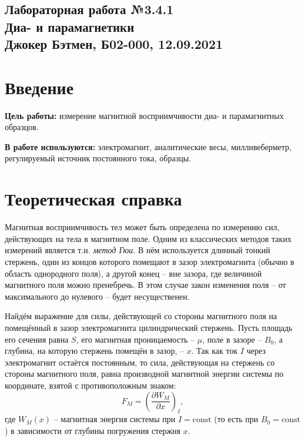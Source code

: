 \documentclass[a4paper,12pt]{article}
\begin{document}
  
\begin{center}
  \section*{Лабораторная работа №3.4.1 \\Диа- и парамагнетики \\Джокер Бэтмен, Б02-000, 12.09.2021}
\end{center}  

\vspace{5mm}
\section*{Введение}

\begin{flushleft}
  \textbf{Цель работы:} измерение магнитной восприимчивости диа- и парамагнитных образцов.
\end{flushleft}

\begin{flushleft}
  \textbf{В работе используются:} электромагнит, аналитические весы, милливеберметр, регулируемый источник постоянного тока, образцы.
\end{flushleft}

\section*{Теоретическая справка}

Магнитная восприимчивость тел может быть определена по измерению сил, действующих на тела в магнитном поле. Одним из классических методов таких измерений является т.н. \textit{метод Гюи}. В нём используется длинный тонкий стержень, один из концов которого помещают в зазор электромагнита (обычно в область однородного поля), а другой конец -- вне зазора, где величиной магнитного поля можно пренебречь. В этом случае закон изменения поля -- от максимального до нулевого -- будет несущественен.

Найдём выражение для силы, действующей со стороны магнитного поля на помещённый в зазор электромагнита цилиндрический стержень. Пусть площадь его сечения равна $S$, его магнитная проницаемость -- $\mu$, поле в зазоре -- $B_0$, а глубина, на которую стержень помещён в зазор, -- $x$. Так как ток $I$ через электромагнит остаётся постоянным, то сила, действующая на стержень со стороны магнитного поля, равна производной магнитной энергии системы по координате, взятой с противоположным знаком:\[F_M=\left(\frac{\partial W_M}{\partial x}\right)_I,\]где $W_M(x)$ -- магнитная энергия системы при $I=\text{const}$ (то есть при $B_0=\text{const}$) в зависимости от глубины погружения стержня $x$.
\end{document}
